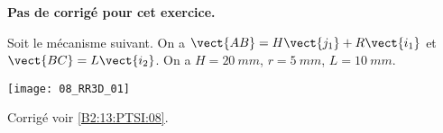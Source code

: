 \normalfalse \difficiletrue \tdifficilefalse
\correctionfalse


\setcounter{numques}{0}
\ifcorrection
\else
\textbf{Pas de corrigé pour cet exercice.}
\fi

\ifprof
\else
Soit le mécanisme suivant. On a $\vect{AB}=H\vect{j_1}+R\vect{i_1}$ et $\vect{BC}=L\vect{i_2}$. On a $H=\SI{20}{mm}$, $r=\SI{5}{mm}$, $L=\SI{10}{mm}$. 
\begin{center}
\texttt{[image: 08\_RR3D\_01]}
\end{center}
\fi

\ifprof
\else
\fi



\ifprof
\else
\footnotesize

\normalsize
\begin{flushright}
\footnotesize{Corrigé  voir \ref{B2:13:PTSI:08}.}
\end{flushright}%
\fi